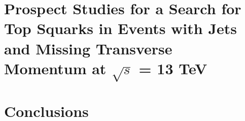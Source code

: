 \documentclass[
twoside,
headsepline,     %
headings=normal,
openright,
numbers=noenddot, %
a4paper
]{scrreprt} %
\begin{document}
\chapter[Prospect Studies for a Search for Top Squarks at $\sqrt{s}$ = 13 TeV]{Prospect Studies for a Search for Top Squarks in Events with Jets and Missing Transverse Momentum at $\sqrt{s}$ = 13 TeV} \label{chap:Stop}


\chapter{Conclusions} \label{chap:Conclusion}


\cleardoublepage

\appendix





\cleardoublepage
\thispagestyle{empty}
\chapter*{~}
\cleardoublepage
\thispagestyle{empty}
\chapter*{~}


\cleardoublepage
\thispagestyle{empty}
\chapter*{~}
%

\end{document}
